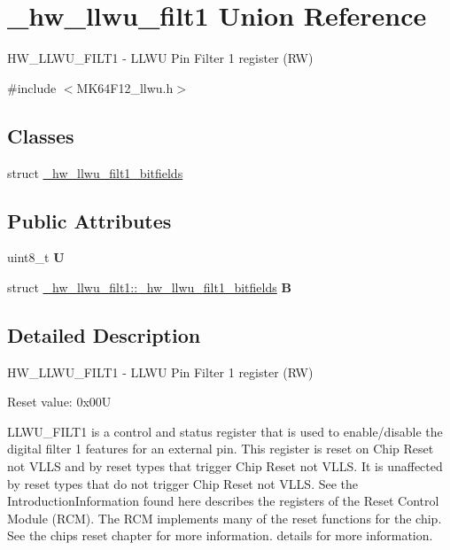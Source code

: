 \hypertarget{union__hw__llwu__filt1}{}\section{\+\_\+hw\+\_\+llwu\+\_\+filt1 Union Reference}
\label{union__hw__llwu__filt1}


H\+W\+\_\+\+L\+L\+W\+U\+\_\+\+F\+I\+L\+T1 -\/ L\+L\+WU Pin Filter 1 register (RW)  




{\ttfamily \#include $<$M\+K64\+F12\+\_\+llwu.\+h$>$}

\subsection*{Classes}
\begin{DoxyCompactItemize}
\item 
struct \hyperlink{struct__hw__llwu__filt1_1_1__hw__llwu__filt1__bitfields}{\+\_\+hw\+\_\+llwu\+\_\+filt1\+\_\+bitfields}
\end{DoxyCompactItemize}
\subsection*{Public Attributes}
\begin{DoxyCompactItemize}
\item 
uint8\+\_\+t {\bfseries U}\hypertarget{union__hw__llwu__filt1_a68f4a487806ba581d878f11981764922}{}\label{union__hw__llwu__filt1_a68f4a487806ba581d878f11981764922}

\item 
struct \hyperlink{struct__hw__llwu__filt1_1_1__hw__llwu__filt1__bitfields}{\+\_\+hw\+\_\+llwu\+\_\+filt1\+::\+\_\+hw\+\_\+llwu\+\_\+filt1\+\_\+bitfields} {\bfseries B}\hypertarget{union__hw__llwu__filt1_a0a047f2e3ec022ea52131ad2f91c1066}{}\label{union__hw__llwu__filt1_a0a047f2e3ec022ea52131ad2f91c1066}

\end{DoxyCompactItemize}


\subsection{Detailed Description}
H\+W\+\_\+\+L\+L\+W\+U\+\_\+\+F\+I\+L\+T1 -\/ L\+L\+WU Pin Filter 1 register (RW) 

Reset value\+: 0x00U

L\+L\+W\+U\+\_\+\+F\+I\+L\+T1 is a control and status register that is used to enable/disable the digital filter 1 features for an external pin. This register is reset on Chip Reset not V\+L\+LS and by reset types that trigger Chip Reset not V\+L\+LS. It is unaffected by reset types that do not trigger Chip Reset not V\+L\+LS. See the Introduction\+Information found here describes the registers of the Reset Control Module (R\+CM). The R\+CM implements many of the reset functions for the chip. See the chip\textquotesingle{}s reset chapter for more information. details for more information. 

